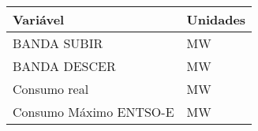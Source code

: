 \begin{tabular}{ll}
\toprule
Variável & Unidades \\
\midrule
BANDA SUBIR & MW \\
BANDA DESCER & MW \\
Consumo real & MW \\
Consumo Máximo ENTSO-E & MW \\
\bottomrule
\end{tabular}
